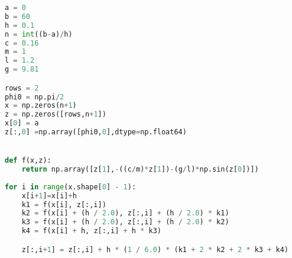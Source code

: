 \documentclass[../ZF_HM2.tex]{subfiles}
\begin{document}
\begin{lstlisting}[language=python]
a = 0
b = 60
h = 0.1
n = int((b-a)/h)
c = 0.16
m = 1
l = 1.2
g = 9.81

rows = 2
phi0 = np.pi/2
x = np.zeros(n+1)
z = np.zeros([rows,n+1])
x[0] = a
z[:,0] =np.array([phi0,0],dtype=np.float64)


def f(x,z):
    return np.array([z[1],-((c/m)*z[1])-(g/l)*np.sin(z[0])])
	
for i in range(x.shape[0] - 1):
    x[i+1]=x[i]+h
    k1 = f(x[i], z[:,i])
    k2 = f(x[i] + (h / 2.0), z[:,i] + (h / 2.0) * k1)
    k3 = f(x[i] + (h / 2.0), z[:,i] + (h / 2.0) * k2)
    k4 = f(x[i] + h, z[:,i] + h * k3)

    z[:,i+1] = z[:,i] + h * (1 / 6.0) * (k1 + 2 * k2 + 2 * k3 + k4)

\end{lstlisting}
\end{document}
